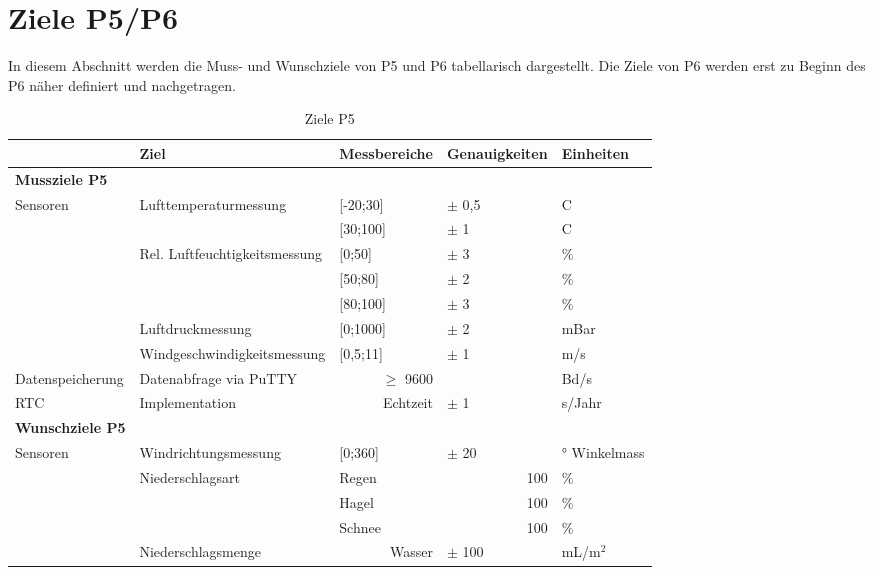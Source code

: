 \section{Ziele P5/P6}

In diesem Abschnitt werden die Muss- und Wunschziele von P5 und P6 tabellarisch dargestellt. Die Ziele von P6 werden erst zu Beginn des P6 näher definiert und nachgetragen.

\begin{table}[htbp]
  \centering
  \caption{Ziele P5}
  \small
    \begin{tabular}{r|l|r|l|l}
          & \textbf{Ziel} & \multicolumn{1}{l|}{\textbf{Messbereiche}} & \textbf{Genauigkeiten} & \textbf{Einheiten} \\
    \toprule
    \multicolumn{1}{l}{\textbf{Mussziele P5}} & \multicolumn{1}{r}{} & \multicolumn{1}{r}{} & \multicolumn{1}{r}{} &  \\
    \toprule
    \multicolumn{1}{l|}{Sensoren} & Lufttemperaturmessung & \multicolumn{1}{l|}{[-20;30]} & $\pm$ 0,5 & C \\
          &       & \multicolumn{1}{l|}{[30;100]} & $\pm$ 1   & C \\
\cline{2-5}           & Rel. Luftfeuchtigkeitsmessung & \multicolumn{1}{l|}{[0;50]} & $\pm$ 3   & \% \\
          &       & \multicolumn{1}{l|}{[50;80]} & $\pm$ 2   & \% \\
          &       & \multicolumn{1}{l|}{[80;100]} & $\pm$ 3   & \% \\
\cline{2-5}           & Luftdruckmessung & \multicolumn{1}{l|}{[0;1000]} & $\pm$ 2   & mBar \\
\cline{2-5}          & Windgeschwindigkeitsmessung & \multicolumn{1}{l|}{[0,5;11]} & $\pm$ 1   & m/s \\
    \hline
    \multicolumn{1}{l|}{Datenspeicherung} & Datenabfrage via PuTTY &   $\geq$ 9600    &       &  Bd/s\\
    \hline
    \multicolumn{1}{l|}{RTC} & Implementation &   Echtzeit    & $\pm$ 1   & s/Jahr \\
    \bottomrule
    \multicolumn{1}{l}{\textbf{Wunschziele P5}} & \multicolumn{1}{r}{} & \multicolumn{1}{r}{} & \multicolumn{1}{r}{} &  \\
    \toprule
    \multicolumn{1}{l|}{Sensoren} & Windrichtungsmessung & \multicolumn{1}{l|}{[0;360]} & $\pm$ 20  & ° Winkelmass \\
\cline{2-5}           & Niederschlagsart & \multicolumn{1}{l|}{Regen} & \multicolumn{1}{r|}{100} & \% \\
          &       & \multicolumn{1}{l|}{Hagel} & \multicolumn{1}{r|}{100} & \% \\
          &       & \multicolumn{1}{l|}{Schnee} & \multicolumn{1}{r|}{100} & \% \\
\cline{2-5}           & Niederschlagsmenge &   Wasser    & $\pm$ 100 & mL/m$^2$ \\
\bottomrule
    \end{tabular}%
  \label{tab:ZieleP5}%
\end{table}%

